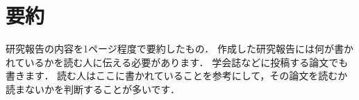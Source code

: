 \chapter*{要約}

研究報告の内容を1ページ程度で要約したもの．
作成した研究報告には何が書かれているかを読む人に伝える必要があります．
学会誌などに投稿する論文でも書きます．
読む人はここに書かれていることを参考にして，その論文を読むか読まないかを判断することが多いです．

\newpage
